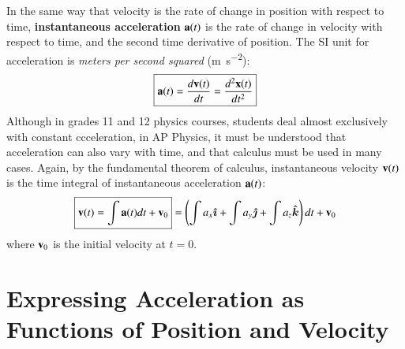 \documentclass{../../../oss-handout}
\newcommand{\mb}[1]{\ensuremath\mathbf{#1}}
\begin{document}
In the same way that velocity is the rate of change in position with respect
to time, \textbf{instantaneous acceleration} $\mb{a}(t)$ is the rate of change
in velocity with respect to time, and the second time derivative of position.
The SI unit for acceleration is \emph{meters per second squared}
(\si{\metre\per\second^2}):
\begin{equation}
  \boxed{\mb{a}(t)= \frac{d\mb{v}(t)}{dt}=\frac{d^2\mb{x}(t)}{dt^2}}
\end{equation}
Although in grades 11 and 12 physics courses, students deal almost exclusively
with constant ccceleration, in AP Physics, it must be understood that
acceleration can also vary with time, and that calculus must be used in many
cases.
Again, by the fundamental theorem of calculus, instantaneous velocity
$\mb{v}(t)$ is the time integral of instantaneous acceleration $\mb{a}(t)$:
\begin{equation}
  \boxed{\mb{v}(t)=\int\mb{a}(t)dt+\mb{v}_0} =
    \left(\int a_x\bm{\hat{\imath}} +
    \int a_y\bm{\hat{\jmath}} +
    \int a_z\bm{\hat{k}}\right) dt +\mb{v}_0
\end{equation}
where $\mb{v}_0$ is the initial velocity at $t=0$.

\section{Expressing Acceleration as Functions of Position and Velocity}
\end{document}
